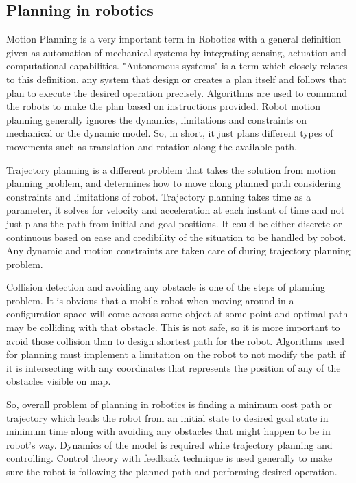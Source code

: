 \documentclass[12pt]{article}
\begin{document}
 \subsection{Planning in robotics}
Motion Planning is a very important term in Robotics with a general definition given as automation of mechanical systems by integrating sensing, actuation and computational capabilities. "Autonomous systems" is a term which closely relates to this definition, any system that design or creates a plan itself and follows that plan to execute the desired operation precisely. Algorithms are used to command the robots to make the plan based on instructions provided. Robot motion planning generally ignores the dynamics, limitations and constraints on mechanical or the dynamic model. So, in short, it just plans different types of movements such as translation and rotation along the available path.  \par \noindent
Trajectory planning is a different problem that takes the solution from motion planning problem, and determines how to move along planned path considering constraints and limitations of robot. Trajectory planning takes time as a parameter, it solves for velocity and acceleration at each instant of time and not just plans the path from initial and goal positions. It could be either discrete or continuous based on ease and credibility of the situation to be handled by robot. Any dynamic and motion constraints are taken care of during trajectory planning problem. 
\par \noindent
Collision detection and avoiding any obstacle is one of the steps of planning problem. It is obvious that a mobile robot when moving around in a configuration space will come across some object at some point and optimal path may be colliding with that obstacle. This is not safe, so it is more important to avoid those collision than to design shortest path for the robot. Algorithms used for planning must implement a limitation on the robot to not modify the path if it is intersecting with any coordinates that represents the position of any of the obstacles visible on map. 
\par \noindent
So, overall problem of planning in robotics is finding a minimum cost path or trajectory which leads the robot from an initial state to desired goal state in minimum time along with avoiding any obstacles that might happen to be in robot's way. Dynamics of the model is required while trajectory planning and controlling. Control theory with feedback technique is used generally to make sure the robot is following the planned path and performing desired operation. 
\end{document}
